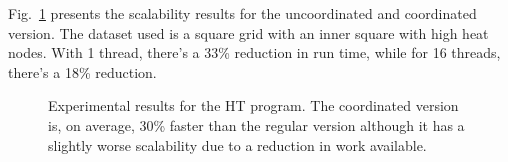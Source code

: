 Fig.~\ref{results:ht} presents the scalability results for the uncoordinated
and coordinated version. The dataset used is a square grid with an inner square
with high heat nodes. With 1 thread, there's a 33\% reduction in run time, while
for 16 threads, there's a 18\% reduction.

\begin{figure}[ht!]
   \begin{center}
   \end{center}
   \caption{Experimental results for the HT program. The coordinated version
      is, on average, 30\% faster than the regular version although it has a
      slightly worse scalability due to a reduction in work available.}
   \label{results:ht}
\end{figure}
